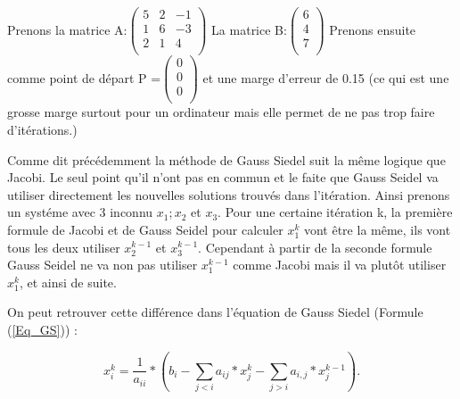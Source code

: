 \documentclass[12pt]{article}
\begin{document}
Prenons la matrice A:$
  \begin{pmatrix}
 
    5 & 2 & -1 \\

    1 & 6 & -3 \\

    2 & 1 & 4 \\

  \end{pmatrix}
  $ La matrice B:$
  \begin{pmatrix}
 
    6 \\

    4 \\

    7 \\

  \end{pmatrix}
  $ Prenons ensuite comme point de départ P =$
  \begin{pmatrix}
 
    0 \\

    0 \\

    0 \\

  \end{pmatrix}
  $ et une marge d'erreur de 0.15 (ce qui est une grosse marge surtout pour un ordinateur mais elle permet de ne pas trop faire d'itérations.)


  Comme dit précédemment la méthode de Gauss Siedel suit la même logique que Jacobi. Le seul point qu'il n'ont pas en commun et le faite que Gauss Seidel va utiliser directement les nouvelles solutions trouvés dans l'itération.
  Ainsi prenons un systéme avec 3 inconnu $x_1 ; x_2 $ et $ x_3 $. Pour une certaine itération k, la première formule de Jacobi et de Gauss Seidel pour calculer $x_1^{k}$ vont être la même, ils vont tous les deux utiliser $x_2^{k-1}$ et $x_3^{k-1}$. Cependant à partir de la seconde formule Gauss Seidel ne va non pas utiliser $x_1^{k-1}$ comme Jacobi mais il va plutôt utiliser $x_1^k$, et ainsi de suite.
  
  On peut retrouver cette différence dans l'équation de Gauss Siedel (Formule (\ref{Eq_GS})) :

  \begin{equation}
    \label{Eq_GS} 
    x_i^k = \frac{1}{a_{i i}} * (b_i - \sum_{j<i} a_{i j} * x_j^k - \sum_{j > i} a_{i,j} * x_j^{k-1}).  
  \end{equation}
\end{document}
